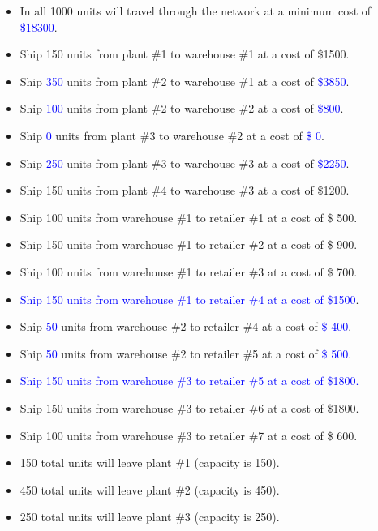 \documentclass[../report/main.tex]{subfiles}
\begin{document}
\begin{itemize}
	\item In all 1000 units will travel through the network at a minimum cost of \textcolor{blue}{\$18300}.
	\newline
	\item Ship 150 units from plant \#1 to warehouse \#1 at a cost of \$1500.
	\item Ship \textcolor{blue}{350} units from plant \#2 to warehouse \#1 at a cost of \textcolor{blue}{\$3850}.
	\item Ship \textcolor{blue}{100} units from plant \#2 to warehouse \#2 at a cost of \textcolor{blue}{\$800}.
	\item Ship   \textcolor{blue}{0} units from plant \#3 to warehouse \#2 at a cost of \textcolor{blue}{\$   0}.
	\item Ship \textcolor{blue}{250} units from plant \#3 to warehouse \#3 at a cost of \textcolor{blue}{\$2250}.
	\item Ship 150 units from plant \#4 to warehouse \#3 at a cost of \$1200.
	\newline
	\item Ship 100 units from warehouse \#1 to retailer \#1 at a cost of \$ 500.
	\item Ship 150 units from warehouse \#1 to retailer \#2 at a cost of \$ 900.
	\item Ship 100 units from warehouse \#1 to retailer \#3 at a cost of \$ 700.
	\item \textcolor{blue}{Ship 150 units from warehouse \#1 to retailer \#4 at a cost of \$1500}.
	\item Ship  \textcolor{blue}{50} units from warehouse \#2 to retailer \#4 at a cost of \textcolor{blue}{\$ 400}.
	\item Ship  \textcolor{blue}{50} units from warehouse \#2 to retailer \#5 at a cost of \textcolor{blue}{\$ 500}.
	\item \textcolor{blue}{Ship 150 units from warehouse \#3 to retailer \#5 at a cost of \$1800.}
	\item Ship 150 units from warehouse \#3 to retailer \#6 at a cost of \$1800.
	\item Ship 100 units from warehouse \#3 to retailer \#7 at a cost of \$ 600.
	\newline
	\item 150 total units will leave plant \#1 (capacity is 150).
	\item 450 total units will leave plant \#2 (capacity is 450).
	\item 250 total units will leave plant \#3 (capacity is 250).

\end{itemize}
\end{document}
